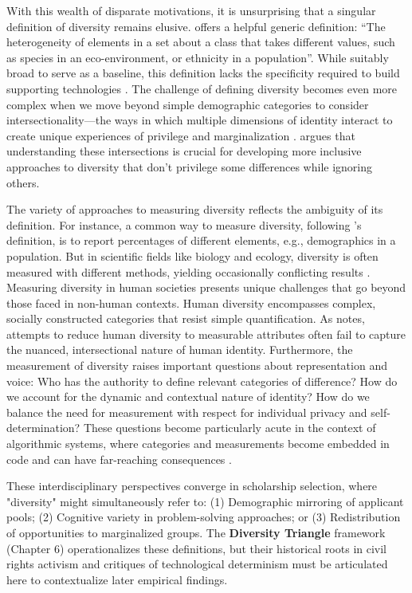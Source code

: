 With this wealth of disparate motivations, it is unsurprising that a singular definition of diversity remains elusive. \textcite{page_diversity_2010} offers a helpful generic definition: ``The heterogeneity of elements in a set about a class that takes different values, such as species in an eco-environment, or ethnicity in a population''. While suitably broad to serve as a baseline, this definition lacks the specificity required to build supporting technologies \cite{hupont2021diverse,page_diversity_2010}. The challenge of defining diversity becomes even more complex when we move beyond simple demographic categories to consider intersectionality—the ways in which multiple dimensions of identity interact to create unique experiences of privilege and marginalization \cite{crenshaw1989demarginalizing}. \textcite{collins2002black} argues that understanding these intersections is crucial for developing more inclusive approaches to diversity that don't privilege some differences while ignoring others.

The variety of approaches to measuring diversity reflects the ambiguity of its definition. For instance, a common way to measure diversity, following \textcite{page_diversity_2010}'s definition, is to report percentages of different elements, e.g., demographics in a population. But in scientific fields like biology and ecology, diversity is often measured with different methods, yielding occasionally conflicting results \cite{xu2020diversity}. Measuring diversity in human societies presents unique challenges that go beyond those faced in non-human contexts. Human diversity encompasses complex, socially constructed categories that resist simple quantification. As \textcite{scheuerman2019computers} notes, attempts to reduce human diversity to measurable attributes often fail to capture the nuanced, intersectional nature of human identity. Furthermore, the measurement of diversity raises important questions about representation and voice: Who has the authority to define relevant categories of difference? How do we account for the dynamic and contextual nature of identity? How do we balance the need for measurement with respect for individual privacy and self-determination? These questions become particularly acute in the context of algorithmic systems, where categories and measurements become embedded in code and can have far-reaching consequences \cite{bowker1999sorting}.

These interdisciplinary perspectives converge in scholarship selection, where "diversity" might simultaneously refer to: (1) Demographic mirroring of applicant pools; (2) Cognitive variety in problem-solving approaches; or (3) Redistribution of opportunities to marginalized groups. The \textbf{Diversity Triangle} framework (Chapter 6) operationalizes these definitions, but their historical roots in civil rights activism and critiques of technological determinism \cite{winner1980artefacts} must be articulated here to contextualize later empirical findings.

